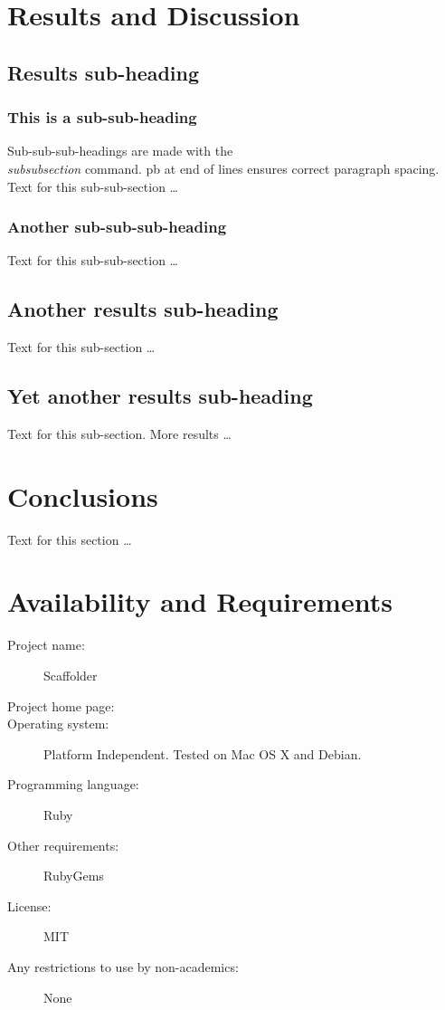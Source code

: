 \documentclass[10pt]{bmc_article}
\newenvironment{bmcformat}{\begin{raggedright}\baselineskip20pt\sloppy\setboolean{publ}{false}}{\end{raggedright}\baselineskip20pt\sloppy}
\begin{document}
\begin{bmcformat}
\section*{Results and Discussion}
  \subsection*{Results sub-heading}
    \subsubsection*{This is a sub-sub-heading}
      Sub-sub-sub-headings are made with the \textsl{\\subsubsection} command. \pb
      pb at end of lines ensures correct paragraph spacing.\pb
	  Text for this sub-sub-section \ldots
    \subsubsection*{Another sub-sub-sub-heading}
      Text for this sub-sub-section \ldots

  \subsection*{Another results sub-heading}
    Text for this sub-section \ldots

  \subsection*{Yet another results sub-heading}
    Text for this sub-section.  More results \ldots
\section*{Conclusions}
  Text for this section \ldots
\section*{Availability and Requirements}

  \begin{description}
    \item[Project name:] Scaffolder
    \item[Project home page:] \scaffolder
    \item[Operating system:] Platform Independent. Tested on Mac OS X and
    Debian.
    \item[Programming language:] Ruby
    \item[Other requirements:] RubyGems
    \item[License:] MIT
    \item[Any restrictions to use by non-academics:] None
  \end{description}


\end{bmcformat}
\end{document}
